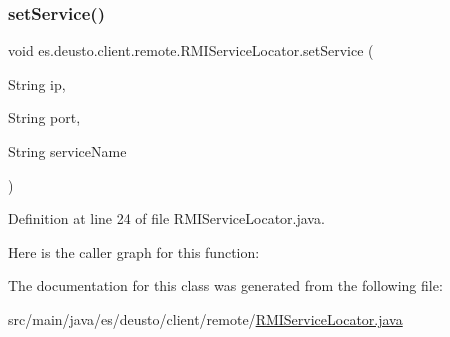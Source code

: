 \subsubsection{\texorpdfstring{setService()}{setService()}}
{\footnotesize\ttfamily void es.\+deusto.\+client.\+remote.\+R\+M\+I\+Service\+Locator.\+set\+Service (\begin{DoxyParamCaption}\item[{String}]{ip,  }\item[{String}]{port,  }\item[{String}]{service\+Name }\end{DoxyParamCaption})}



Definition at line 24 of file R\+M\+I\+Service\+Locator.\+java.

Here is the caller graph for this function\+:


The documentation for this class was generated from the following file\+:\begin{DoxyCompactItemize}
\item 
src/main/java/es/deusto/client/remote/\mbox{\hyperlink{_r_m_i_service_locator_8java}{R\+M\+I\+Service\+Locator.\+java}}\end{DoxyCompactItemize}
